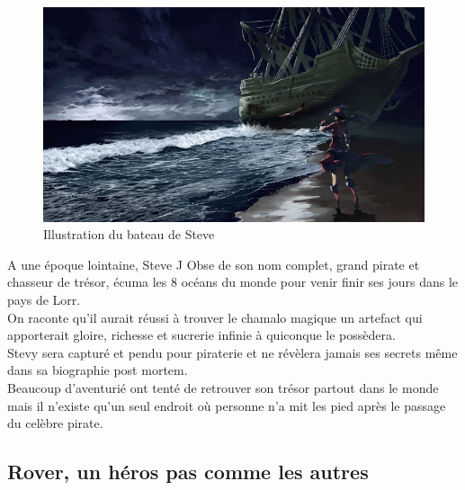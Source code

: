 \documentclass[a4paper 12pts]{article}
\begin{document}
\begin{figure}[h]
  	\includegraphics[width=350pt]{Illustration/Steve.jpg}
	\caption{Illustration du bateau de Steve}
\end{figure}

\vspace{1cm}

A une époque lointaine, Steve J Obse de son nom complet, grand pirate et chasseur de trésor, écuma les 8 océans du monde pour venir finir ses jours dans le pays de Lorr.\\
On raconte qu'il aurait réussi à trouver le chamalo magique un artefact qui apporterait gloire, richesse et sucrerie infinie à quiconque le possèdera.\\
Stevy sera capturé et pendu pour piraterie et ne révèlera jamais ses secrets même dans sa biographie post mortem.\\
Beaucoup d'aventurié ont tenté de retrouver son trésor partout dans le monde mais il n'existe qu'un seul endroit où personne n'a mit les pied après le passage du celèbre pirate.



\newpage

\subsection{Rover, un héros pas comme les autres}

\vspace{1cm}
\end{document}
